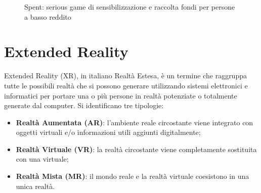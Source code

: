 \begin{figure} [h!]
    \center
    \caption{Spent: serious game di sensibilizzazione e raccolta fondi per persone a basso reddito}
    \label{fig:spentGame}
\end{figure}
%
\section{Extended Reality}
\label{sec:xr}
Extended Reality (XR), in italiano Realtà Estesa, è un termine che raggruppa tutte le possibili realtà che si possono generare utilizzando sistemi elettronici e informatici per portare una o più persone in realtà potenziate o totalmente generate dal computer.
Si identificano tre tipologie:

\begin{itemize}
    \item \textbf{Realtà Aumentata (AR)}: l'ambiente reale circostante viene integrato con oggetti virtuali e/o informazioni utili aggiunti digitalmente;
    \item \textbf{Realtà Virtuale (VR)}: la realtà circostante viene completamente sostituita con una virtuale;
    \item \textbf{Realtà Mista (MR)}: il mondo reale e la realtà virtuale coesistono in una unica realtà.
\end{itemize}

